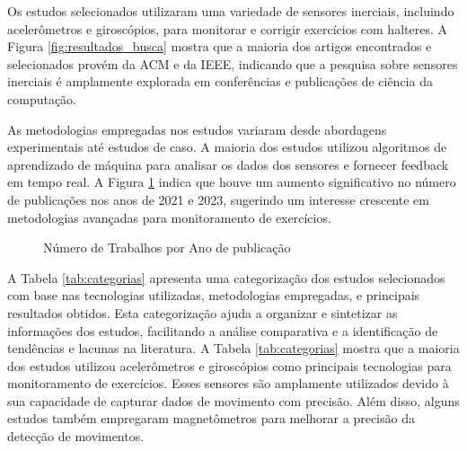 \documentclass[conference]{IEEEtran}
\begin{document}
Os estudos selecionados utilizaram uma variedade de sensores inerciais, incluindo acelerômetros e giroscópios, para monitorar e corrigir exercícios com halteres. A Figura \ref{fig:resultados_busca} mostra que a maioria dos artigos encontrados e selecionados provém da ACM e da IEEE, indicando que a pesquisa sobre sensores inerciais é amplamente explorada em conferências e publicações de ciência da computação.

As metodologias empregadas nos estudos variaram desde abordagens experimentais até estudos de caso. A maioria dos estudos utilizou algoritmos de aprendizado de máquina para analisar os dados dos sensores e fornecer feedback em tempo real. A Figura \ref{fig:trabalhos_por_ano} indica que houve um aumento significativo no número de publicações nos anos de 2021 e 2023, sugerindo um interesse crescente em metodologias avançadas para monitoramento de exercícios.

\begin{figure}[htbp]
    \centering
    \caption{Número de Trabalhos por Ano de publicação}
    \label{fig:trabalhos_por_ano}
    \end{figure}

A Tabela \ref{tab:categorias} apresenta uma categorização dos estudos selecionados com base nas tecnologias utilizadas, metodologias empregadas, e principais resultados obtidos. Esta categorização ajuda a organizar e sintetizar as informações dos estudos, facilitando a análise comparativa e a identificação de tendências e lacunas na literatura. A Tabela \ref{tab:categorias} mostra que a maioria dos estudos utilizou acelerômetros e giroscópios como principais tecnologias para monitoramento de exercícios. Esses sensores são amplamente utilizados devido à sua capacidade de capturar dados de movimento com precisão. Além disso, alguns estudos também empregaram magnetômetros para melhorar a precisão da detecção de movimentos. 
\end{document}
